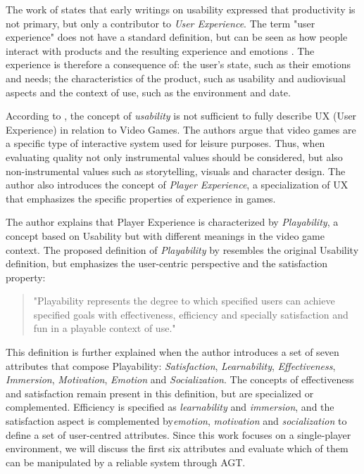 The work of \citep{ARTICLE_UserExperienceAResearchAgenda} states that early writings on usability expressed that productivity is not primary, but only a contributor to \emph{User Experience}. The term "user experience" does not have a standard definition, but can be seen as how people interact with products and the resulting experience and emotions \cite{ARTICLE_UnderstandingExperience}. The experience is therefore a consequence of: the user's state, such as their emotions and needs; the characteristics of the product, such as usability and audiovisual aspects and the context of use, such as the environment and date.

According to \cite{ARTICLE_FromUsabilityToPlayability}, the concept of \emph{usability} is not sufficient to fully describe UX (User Experience) in relation to Video Games. The authors argue that video games are a specific type of interactive system used for leisure purposes. Thus, when evaluating quality not only instrumental values should be considered, but also non-instrumental values such as storytelling, visuals and character design. The author also introduces the concept of \emph{Player Experience}, a specialization of UX that emphasizes the specific properties of experience in games.

The author explains that Player Experience is characterized by \emph{Playability}, a concept based on Usability but with different meanings in the video game context. The proposed definition of \emph{Playability} by \cite{ARTICLE_FromUsabilityToPlayability} resembles the original Usability definition, but emphasizes the user-centric perspective and the satisfaction property:

\begin{quotation}
"Playability represents the degree to which specified users can achieve specified goals with effectiveness, efficiency and specially satisfaction and fun in a playable context of use."
\end{quotation}

This definition is further explained when the author introduces a set of seven attributes that compose Playability: \emph{Satisfaction}, \emph{Learnability}, \emph{Effectiveness}, \emph{Immersion}, \emph{Motivation}, \emph{Emotion} and \emph{Socialization}. The concepts of effectiveness and satisfaction remain present in this definition, but are specialized or complemented. Efficiency is specified as \emph{learnability} and \emph{immersion}, and the satisfaction aspect is complemented by\emph{emotion}, \emph{motivation} and \emph{socialization} to define a set of user-centred attributes. Since this work focuses on a single-player environment, we will discuss the first six attributes and evaluate which of them can be manipulated by a reliable system through AGT.

